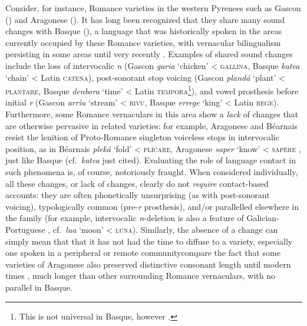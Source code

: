 \documentclass[output=paper,colorlinks,citecolor=brown]{langscibook}
\begin{document}
Consider, for instance, Romance varieties in the western Pyrenees such as Gascon () and Aragonese (). It has long been recognized that they share many sound changes with Basque (), a language that was historically spoken in the areas currently occupied by these Romance varieties, with vernacular bilingualism persisting in some areas until very recently \parencite[for overviews, see][]{jungemann1950la,baldinger1958la,rohlfs1970le,haase1997gascon}. Examples of shared sound changes include the loss of intervocalic \emph{n} (Gascon \emph{garia} `chicken' < \textsc{gallina}, Basque \emph{katea} `chain' < Latin \textsc{catena}), post\hyp sonorant stop voicing (Gascon \emph{plandá} `plant' < \textsc{plantare}, Basque \emph{denbora} `time' < Latin \textsc{tempora}\footnote{This is not universal in Basque, however \parencite[ 132]{trask1997basque}.}), and vowel prosthesis before initial \emph{r} (Gascon \emph{arrìu} `stream' < \textsc{rivu}, Basque \emph{errege} `king' < Latin \textsc{rege}). Furthermore, some Romance vernaculars in this area show a \emph{lack} of changes that are otherwise pervasive in related varieties: for example, Aragonese and Béarnais resist the lenition of Proto-Romance singleton voiceless stops in intervocalic position, as in Béarnais \emph{pleká} `fold' < \textsc{plĭcare}, Aragonese \emph{saper} `know' < \textsc{sapēre} \parencite{elcock1938de}, just like Basque (cf.~\textit{katea} just cited). Evaluating the role of language contact in such phenomena is, of course, notoriously fraught. When considered individually, all these changes, or lack of changes, clearly do not \emph{require} contact-based accounts: they are often phonetically unsurprising (as with post\hyp sonorant voicing), typologically common (pre-\emph{r} prosthesis), and/or parallelled elsewhere in the family (for example, intervocalic \emph{n}-deletion is also a feature of Galician-Portuguese , cf.~\emph{lua} `moon' < \textsc{luna}). Similarly, the absence of a change can simply mean that that it has not had the time to diffuse to a variety, especially one spoken in a peripheral or remote community\dash compare the fact that some varieties of Aragonese also preserved distinctive consonant length until modern times \parencite{badía1950el}, much longer than other surrounding Romance vernaculars, with no parallel in Basque.
\end{document}
